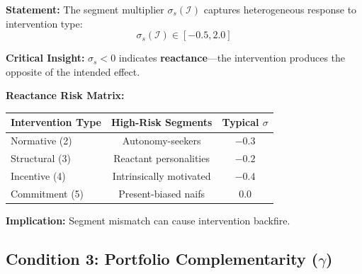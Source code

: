 \begin{tcolorbox}[colback=gray!5!white, colframe=gray!75!black,
    title=EIH Condition 2: Segment Fit (from HHH Axiom HHH-5)]

\textbf{Statement:} The segment multiplier $\sigma_s(\mathcal{I})$ captures
heterogeneous response to intervention type:
\begin{equation}
\sigma_s(\mathcal{I}) \in [-0.5, 2.0]
\label{eq:sigma-range}
\end{equation}

\textbf{Critical Insight:} $\sigma_s < 0$ indicates \textbf{reactance}---the
intervention produces the opposite of the intended effect.

\textbf{Reactance Risk Matrix:}
\begin{center}
\renewcommand{\arraystretch}{1.2}
\begin{tabular}{@{}lcc@{}}
\toprule
\textbf{Intervention Type} & \textbf{High-Risk Segments} & \textbf{Typical $\sigma$} \\
\midrule
Normative (2) & Autonomy-seekers & $-0.3$ \\
Structural (3) & Reactant personalities & $-0.2$ \\
Incentive (4) & Intrinsically motivated & $-0.4$ \\
Commitment (5) & Present-biased naifs & $0.0$ \\
\bottomrule
\end{tabular}
\end{center}

\textbf{Implication:} Segment mismatch can cause intervention backfire.
\end{tcolorbox}

\subsection{Condition 3: Portfolio Complementarity ($\gamma$)}

